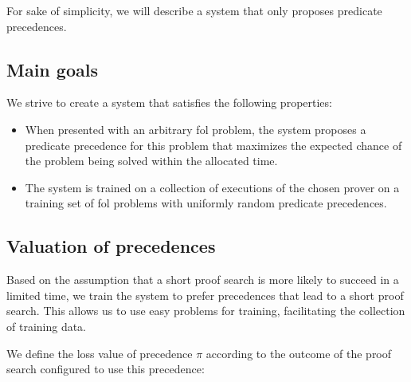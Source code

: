For sake of simplicity,
we will describe a system that only proposes predicate precedences.

\subsection{Main goals}

We strive to create a system that satisfies the following properties:

\begin{itemize}
	\item When presented with an arbitrary \gls{fol} problem,
	the system proposes a predicate precedence for this problem
	that maximizes the expected chance of the problem being solved
	within the allocated time.
	
	
	\item The system is trained on a collection of executions of the chosen prover
	on a training set of \gls{fol} problems
	with uniformly random predicate precedences.
\end{itemize}

\subsection{Valuation of precedences}

Based on the assumption that a short proof search is more likely to succeed in a limited time\cite{?},
we train the system to prefer precedences that lead to a short proof search.
This allows us to use easy problems for training, facilitating the collection of training data.

We define the loss value of precedence \(\pi\) according to the outcome of the proof search
configured to use this precedence:

